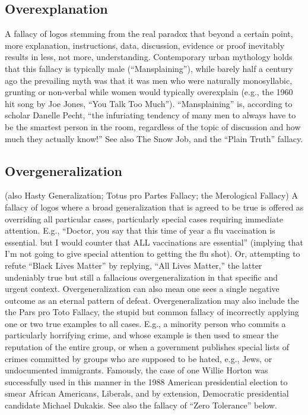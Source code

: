 \documentclass[10pt,a4paper,british]{article}
\begin{document}
\begin{multicols}{2}
    \subsection{Overexplanation} A fallacy of logos stemming from the real paradox that beyond a certain point, more explanation, instructions, data, discussion, evidence or proof inevitably results in less, not more, understanding. Contemporary urban mythology holds that this fallacy is typically male (``Mansplaining''), while barely half a century ago the prevailing myth was that it was men who were naturally monosyllabic, grunting or non{-}verbal while women would typically overexplain (e.g., the 1960 hit song by Joe Jones, ``You Talk Too Much''). ``Mansplaining'' is, according to scholar Danelle Pecht, ``the infuriating tendency of many men to always have to be the smartest person in the room, regardless of the topic of discussion and how much they actually know!''  See also The Snow Job, and the ``Plain Truth'' fallacy.  

    \subsection{Overgeneralization} (also Hasty Generalization; Totus pro Partes Fallacy; the Merological Fallacy) A fallacy of logos where a  broad generalization that is agreed to be true is offered as overriding all particular cases, particularly special cases requiring immediate attention.  E.g., ``Doctor, you say that this time of year a  flu vaccination is essential. but I would counter that ALL vaccinations are essential'' (implying that I'm not going to give special attention to getting the flu shot). Or, attempting to refute ``Black Lives Matter'' by replying, ``All Lives Matter,'' the latter undeniably true but still a fallacious overgeneralization in that specific and urgent context.  Overgeneralization can also mean one sees a single negative outcome as an eternal pattern of defeat. Overgeneralization may also include the the Pars pro Toto Fallacy, the stupid but common fallacy of incorrectly applying one or two true examples to all cases. E.g., a minority person who commits a particularly horrifying crime, and whose example is then used to smear the reputation of the entire group, or when a government publishes special lists of crimes committed by groups who are supposed to be hated, e.g., Jews, or undocumented immigrants. Famously, the case of one Willie Horton was successfully used in this manner in the 1988 American presidential election to smear African Americans, Liberals, and by extension, Democratic presidential candidate Michael Dukakis. See also the fallacy of ``Zero Tolerance'' below.  


\end{multicols}
\end{document}
